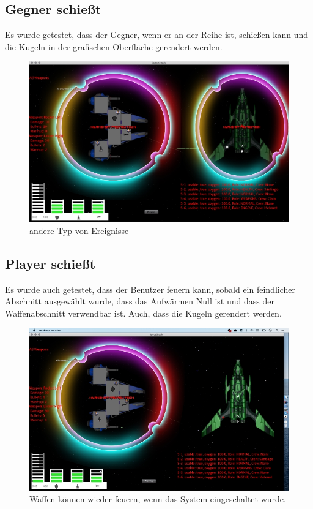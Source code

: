 \documentclass[12pt]{article}
\begin{document}
\newpage
\subsection{Gegner schießt}
Es wurde getestet, dass der Gegner, wenn er an der Reihe ist, schießen kann und die Kugeln in der grafischen Oberfläche gerendert werden.
\begin{figure}[htp]
\centering
\includegraphics[scale=0.7]{TestProtocolBilder/OptimizedgegnerShots.png}
\caption{andere Typ von Ereignisse}
\end{figure}


\newpage
\subsection{Player schießt}
Es wurde auch getestet, dass der Benutzer feuern kann, sobald ein feindlicher Abschnitt ausgewählt wurde, dass das Aufwärmen Null ist und dass der Waffenabschnitt verwendbar ist. Auch, dass die Kugeln gerendert werden.
\begin{figure}[htp]
\centering
\includegraphics[scale=0.7]{TestProtocolBilder/OptimizedweaponsShot.png}
\caption{Waffen können wieder feuern, wenn das System eingeschaltet wurde.}
\end{figure}
\end{document}
